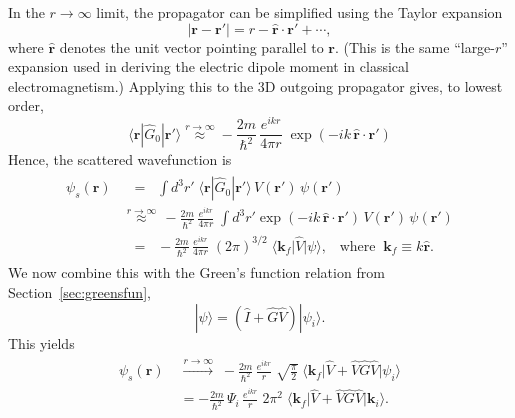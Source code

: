 \documentclass[pra,12pt]{revtex4}
\begin{document}
In the $r\rightarrow\infty$ limit, the propagator can be simplified
using the Taylor expansion
\begin{equation}
  |\mathbf{r} - \mathbf{r}'| = r - \hat{\mathbf{r}} \cdot \mathbf{r}' + \cdots,
\end{equation}
where $\hat{\mathbf{r}}$ denotes the unit vector pointing parallel to
$\mathbf{r}$.  (This is the same ``large-$r$'' expansion used in
deriving the electric dipole moment in classical electromagnetism.)
Applying this to the 3D outgoing propagator gives, to lowest order,
\begin{equation}
  \langle\mathbf{r}|\hat{G}_0|\mathbf{r}'\rangle \overset{r\rightarrow\infty}{\approx} - \frac{2m}{\hbar^2}\, \frac{e^{ikr}}{4\pi r}\; \exp\left(-ik \, \hat{\mathbf{r}} \cdot \mathbf{r}'\right)
\end{equation}
Hence, the scattered wavefunction is
\begin{align}
  \begin{aligned}\psi_s(\mathbf{r}) &\;\;= \;\; \int d^3r'\; \langle\mathbf{r}|\hat{G}_0|\mathbf{r}'\rangle\, V(\mathbf{r}')\, \psi(\mathbf{r}') \\ &\overset{r\rightarrow\infty}{\approx} \, - \frac{2m}{\hbar^2} \, \frac{e^{ikr}}{4\pi r}\; \int d^3r' \exp\left(-ik \, \hat{\mathbf{r}} \cdot \mathbf{r}'\right)\, V(\mathbf{r}')\, \psi(\mathbf{r}') \\ &\;\;=\;\; - \frac{2m}{\hbar^2} \, \frac{e^{ikr}}{4\pi r} \; (2\pi)^{3/2} \; \big\langle \mathbf{k}_f \big|\hat{V}\big|\psi\big\rangle, \;\;\;\mathrm{where}\;\; \mathbf{k}_f \equiv k \hat{\mathbf{r}}. \end{aligned}
\end{align}
We now combine this with the Green's function relation from
Section~\ref{sec:greensfun},
\begin{equation}
  |\psi\rangle = \left(\hat{I} + \hat{G}\hat{V}\right)|\psi_i\rangle.
\end{equation}
This yields
\begin{align}
  \begin{aligned}\psi_s(\mathbf{r}) \; &\overset{r\rightarrow\infty}{\longrightarrow} \; - \frac{2m}{\hbar^2} \, \frac{e^{ikr}}{r} \; \sqrt{\frac{\pi}{2}} \; \big\langle \mathbf{k}_f \big|\hat{V} + \hat{V}\hat{G}\hat{V}\big|\psi_i\big\rangle \\ &= - \frac{2m}{\hbar^2} \, \Psi_i\, \frac{e^{ikr}}{r} \; 2\pi^2 \; \big\langle \mathbf{k}_f \big|\hat{V} + \hat{V}\hat{G}\hat{V}\big|\mathbf{k}_i\big\rangle.\end{aligned}
\end{align}
\end{document}
